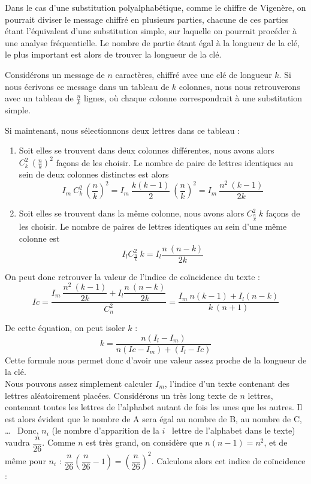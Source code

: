Dans le cas d'une substitution polyalphabétique, comme le chiffre
de Vigenère, on pourrait diviser le message chiffré en plusieurs
parties, chacune de ces parties étant l'équivalent d'une
substitution simple, sur laquelle on pourrait procéder à une
analyse fréquentielle. Le nombre de partie étant égal à la
longueur de la clé, le plus important est alors de trouver la
longueur de la clé.

Considérons un message de $n$ caractères, chiffré avec une clé de
longueur $k$. Si nous écrivons ce message dans un tableau de $k$
colonnes, nous nous retrouverons avec un tableau de $\frac{n}{k}$
lignes, où chaque colonne correspondrait à une substitution
simple.

Si maintenant, nous sélectionnons deux lettres dans ce tableau :
\begin{enumerate}
  \item Soit elles se trouvent dans deux colonnes différentes, 
nous avons
alors $C_k^2 ~ (\frac{n}{k})^2$ façons de les choisir. Le nombre
de paire de lettres identiques au sein de deux colonnes distinctes
est alors
\[ I_m ~ C_k^2 ~ \left(\dfrac{n}{k}\right)^2 = 
I_m ~ \dfrac{k (k - 1)}{2} ~
\left(\dfrac{n}{k}\right)^2 = I_m ~ \dfrac{n^2 ~ (k-1)}{2k} \]
  \item Soit elles se trouvent dans la même colonne, nous avons
alors $C_{\frac{n}{k}}^2 ~ k $ façons de les choisir. Le nombre de
paires de lettres %
identiques au sein d'une même colonne est
\[ I_l C_{\frac{n}{k}}^2 ~ k = I_l
\dfrac{n ~ (n-k)}{2k} \]
\end{enumerate}

On peut donc retrouver la valeur de l'indice de coïncidence du
texte :
\[Ic = \dfrac{I_m ~ \dfrac{n^2 ~ (k-1)}{2k} +
I_l \dfrac{n ~ (n-k)}{2k}}{C_n^2} =
\dfrac{I_m ~ n (k-1) + I_l (n-k)}{k ~
(n+1)} \]

De cette équation, on peut isoler $k$ :
\[k = \dfrac{n (I_l - I_m)}{n (Ic - I_m) + (I_l - Ic)} \]
Cette formule nous permet donc d'avoir une valeur assez proche de
la longueur de la clé.
\\

Nous pouvons assez simplement calculer $I_m$, l'indice d'un texte
contenant des lettres aléatoirement placées. Considérons un très
long texte de $n$ lettres, contenant toutes les lettres de
l'alphabet autant de fois les unes que les autres.
 Il est alors évident que le nombre de A
sera égal au nombre de B, au nombre de C, \dots~
Donc, $n_i$ (le nombre d'apparition de la $i$\ieme~ lettre de
l'alphabet dans le texte) vaudra $\dfrac{n}{26}$.
Comme $n$ est très grand, on considère que $n (n-1) = n^2$, et de
même pour $n_i$ : $\dfrac{n}{26} \left(\dfrac{n}{26} - 1\right) =
\left(\dfrac{n}{26}\right)^2$.
Calculons alors cet indice de coïncidence :

